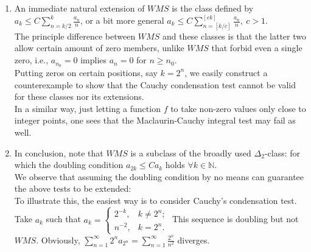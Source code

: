 \begin{ex*}
    \begin{enumerate}
        \item An immediate natural extension of $WMS$ is the class defined by $a_k \leq C \sum_{n=k/2}^k \frac{a_n}{n}$, or a bit more general $a_k \leq C \sum_{n=[k/c]}^{[ck]} \frac{a_n}{n},\ c > 1$. \\
        The principle difference between $WMS$ and these classes is that the latter two allow certain amount of zero members, unlike $WMS$ that forbid even a single zero, i.e., $a_{n_0} = 0$ implies $a_n = 0$ for $n \geq n_0$. \\
        Putting zeros on certain positions, say $k = 2^n$, we easily construct a counterexample to show that the Cauchy condensation test cannot be valid for these classes nor its extensions. \\
        In a similar way, just letting a function $f$ to take non-zero values only close to integer points, one sees that the Maclaurin-Cauchy integral test may fail as well. 
        \item In conclusion, note that $WMS$ is a subclass of the broadly used $\Delta_2$-class: for which the doubling condition $a_{2k} \leq C a_k$ holds $\forall k \in \mathbb{N}$. \\
        We observe that assuming the doubling condition by no means can guarantee the above tests to be extended: \\
        To illustrate this, the easiest way is to consider Cauchy's condensation test. Take ${a_k}$ such that $a_k = \begin{cases} 2^{-k}, & k \neq 2^n; \\ n^{-2}, & k = 2^n. \end{cases}$ This sequence is doubling but not $WMS$. Obviously, $\sum_{n=1}^\infty 2^n a_{2^n} = \sum_{n=1}^\infty \frac{2^n}{n^2}$ diverges. 
    \end{enumerate}
\end{ex*}


